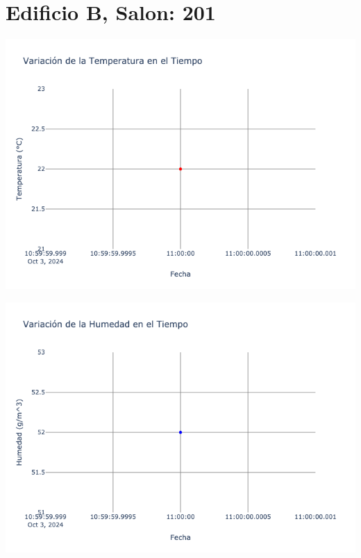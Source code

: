 \documentclass{article}
\begin{document}
    \section{Edificio B, Salon: 201}
    \noindent
    \begin{minipage}{0.48\textwidth}
        \centering
        \includegraphics[width=\textwidth]{../img/poli/TS201-90Dias-03-12-2024.png}
    \end{minipage}
    \hfill
    \begin{minipage}{0.48\textwidth}
        \centering
        \includegraphics[width=\textwidth]{../img/poli/HS201-90Dias-03-12-2024.png}
    \end{minipage}
\end{document}
